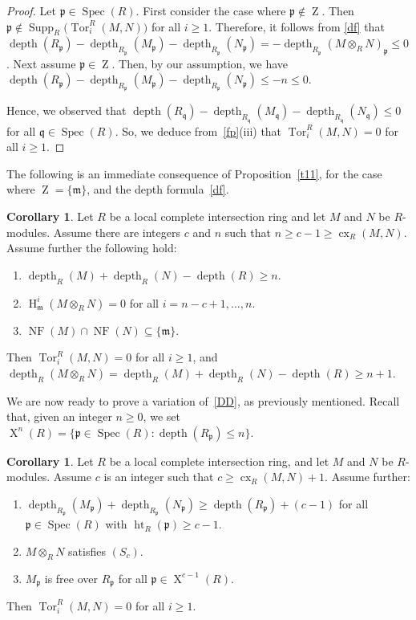 \documentclass[11pt]{amsart}
\theoremstyle{definition}
\newtheorem{cor}[thm]{Corollary}
\theoremstyle{definition}
\numberwithin{equation}{section}
\newcommand{\fm}{\mathfrak{m}}
\newcommand{\fp}{\mathfrak{p}}
\newcommand{\fq}{\mathfrak{q}}
\DeclareMathOperator{\cx}{cx}
\DeclareMathOperator{\X}{X}
\DeclareMathOperator{\mz}{Z}
\DeclareMathOperator{\depth}{depth}
\DeclareMathOperator{\Ht}{ht}
\DeclareMathOperator{\hh}{H}
\DeclareMathOperator{\Supp}{Supp}
\DeclareMathOperator{\Spec}{Spec}
\DeclareMathOperator{\Tor}{Tor}
\DeclareMathOperator{\NF}{NF}
\begin{document}
\begin{proof}
Let $\fp \in \Spec(R)$. First consider the case where $\fp \notin \mz$. Then $\fp \notin \Supp_R\big(\Tor_{i}^R(M,N)\big)$ for all $i\geq 1$. Therefore, it follows from \ref{df} that $\depth(R_{\fp})-\depth_{R_{\fp}}(M_{\fp})-\depth_{R_{\fp}}(N_{\fp})=-\depth_{R_{\fp}}(M\otimes_RN)_{\fp}\leq 0$. Next assume $\fp \in \mz$. Then, by our assumption, we have $\depth(R_{\fp})-\depth_{R_{\fp}}(M_{\fp})-\depth_{R_{\fp}}(N_{\fp})\leq -n\leq 0$. 

Hence, we observed that $\depth(R_{\fq})-\depth_{R_{\fq}}(M_{\fq})-\depth_{R_{\fq}}(N_{\fq})\leq 0$ for all $\fq \in \Spec(R)$. So, we deduce from~\ref{fp}(iii) that $\Tor_i^R(M,N)=0$ for all $i\geq 1$.
\end{proof}	
 
The following is an immediate consequence of Proposition~\ref{t11}, for the case where $\mz=\{\fm\}$, and the depth formula~\ref{df}.

\begin{cor} \label{cxmm1} Let $R$ be a local complete intersection ring and let $M$ and $N$ be $R$-modules. Assume there are integers $c$ and $n$ such that $n\geq c-1 \geq \cx_R(M,N)$. Assume further the following hold:
\begin{enumerate}[\rm(i)]
\item $\depth_{R}(M)+\depth_{R}(N)-\depth(R) \geq n$.
\item $\hh^i_{\fm}(M\otimes_RN)=0$ for all $i=n-c+1, \ldots, n$.
\item $\NF(M)\cap\NF(N)\subseteq\{\fm\}$.
\end{enumerate}
Then $\Tor_i^R(M,N)=0$ for all $i\geq 1$, and $\depth_R(M\otimes_RN)=\depth_{R}(M)+\depth_{R}(N)-\depth(R)\geq n+1$.
\end{cor}

We are now ready to prove a variation of~\ref{DD}, as previously mentioned. Recall that, given an integer $n\geq 0$, we set $\X^{n}(R)=\{\fp \in \Spec(R): \depth(R_{\fp})\leq n \}$.

\begin{cor} \label{DDmore} Let $R$ be a local complete intersection ring, and let $M$ and $N$ be $R$-modules. Assume $c$ is an integer such that $c \geq  \cx_R(M,N)+1$. Assume further:
\begin{enumerate}[\rm(i)]
\item $\depth_{R_\fp}(M_\fp)+\depth_{R_\fp}(N_\fp)\geq \depth(R_\fp)+(c-1)$ for all $\fp \in \Spec(R)$ with $\Ht_R(\fp)\geq c-1$.
\item $M\otimes_RN$ satisfies $(S_{c})$.
\item $M_{\fp}$ is free over $R_{\fp}$ for all $\fp \in \X^{c-1}(R)$. 
\end{enumerate}
Then $\Tor_{i}^R(M,N)=0$ for all $i\geq 1$.
\end{cor}
\end{document}
